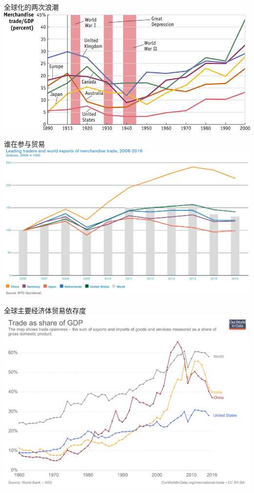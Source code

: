 \documentclass[10pt,hyperref={CJKbookmarks=true},xcolor=dvipsnames,aspectratio=169]{beamer}
\begin{document}
\begin{frame}{全球化的两次浪潮}
\centering \includegraphics[scale=0.7,]{fig/gravity/glo3}
\end{frame}


\begin{frame}{谁在参与贸易}
\centering \includegraphics[scale=0.35]{fig/gravity/leadingtraders}
\end{frame}


\begin{frame}{全球主要经济体贸易依存度}
\centering \includegraphics[scale=0.08]{fig/gravity/trade-as-share-of-gdp}
\end{frame}
\end{document}

